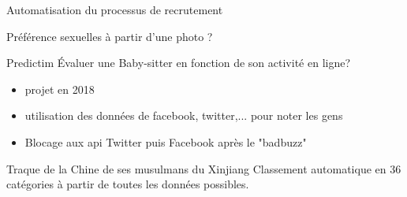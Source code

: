 \begin{frame}{Automatisation du processus de recrutement}
\end{frame}

\begin{frame}{Préférence sexuelles à partir d'une photo ?}
\end{frame}

\begin{frame}{Predictim}
  Évaluer une Baby-sitter en fonction de son activité en ligne?
  \begin{itemize}
    \item projet en 2018
    \item utilisation des données de facebook, twitter,... pour noter les gens
    \item Blocage aux api Twitter puis Facebook après le "badbuzz"
  \end{itemize}
\end{frame}

\begin{frame}{Traque de la Chine de ses musulmans du Xinjiang}
  Classement automatique en 36 catégories à partir de toutes les données possibles.

\end{frame}

